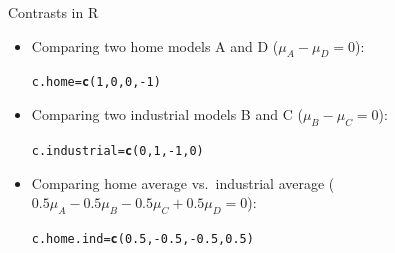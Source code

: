 \documentclass[unknownkeysallowed]{beamer}\usepackage[]{graphicx}\usepackage[]{color}
\makeatletter
\newcommand{\hlnum}[1]{\textcolor[rgb]{0.686,0.059,0.569}{#1}}%
\newcommand{\hlopt}[1]{\textcolor[rgb]{0,0,0}{#1}}%
\newcommand{\hlstd}[1]{\textcolor[rgb]{0.345,0.345,0.345}{#1}}%
\newcommand{\hlkwb}[1]{\textcolor[rgb]{0.69,0.353,0.396}{#1}}%
\newcommand{\hlkwd}[1]{\textcolor[rgb]{0.737,0.353,0.396}{\textbf{#1}}}%
\newenvironment{kframe}{%
 \def\at@end@of@kframe{}%
 \ifinner\ifhmode%
  \def\at@end@of@kframe{\end{minipage}}%
  \begin{minipage}{\columnwidth}%
 \fi\fi%
 \def\FrameCommand##1{\hskip\@totalleftmargin \hskip-\fboxsep
 \colorbox{shadecolor}{##1}\hskip-\fboxsep
     \hskip-\linewidth \hskip-\@totalleftmargin \hskip\columnwidth}%
 \MakeFramed {\advance\hsize-\width
   \@totalleftmargin\z@ \linewidth\hsize
   \@setminipage}}%
 {\par\unskip\endMakeFramed%
 \at@end@of@kframe}
\newenvironment{knitrout}{}{} %
\makeatother
\begin{document}
\begin{frame}[fragile]{Contrasts in R}
  
  \begin{itemize}
  \item Comparing two home models A and D ($\mu_A-\mu_D=0$):
\begin{knitrout}
\color{fgcolor}\begin{kframe}
\begin{alltt}
\hlstd{c.home}\hlkwb{=}\hlkwd{c}\hlstd{(}\hlnum{1}\hlstd{,}\hlnum{0}\hlstd{,}\hlnum{0}\hlstd{,}\hlopt{-}\hlnum{1}\hlstd{)}
\end{alltt}
\end{kframe}
\end{knitrout}

\item Comparing two industrial models B and C ($\mu_B-\mu_C=0$):
  
\begin{knitrout}
\color{fgcolor}\begin{kframe}
\begin{alltt}
\hlstd{c.industrial}\hlkwb{=}\hlkwd{c}\hlstd{(}\hlnum{0}\hlstd{,}\hlnum{1}\hlstd{,}\hlopt{-}\hlnum{1}\hlstd{,}\hlnum{0}\hlstd{)}
\end{alltt}
\end{kframe}
\end{knitrout}

\item Comparing home average vs.\ industrial average ($0.5\mu_A-0.5\mu_B-0.5\mu_C+0.5\mu_D=0$):
  
\begin{knitrout}
\color{fgcolor}\begin{kframe}
\begin{alltt}
\hlstd{c.home.ind}\hlkwb{=}\hlkwd{c}\hlstd{(}\hlnum{0.5}\hlstd{,}\hlopt{-}\hlnum{0.5}\hlstd{,}\hlopt{-}\hlnum{0.5}\hlstd{,}\hlnum{0.5}\hlstd{)}
\end{alltt}
\end{kframe}
\end{knitrout}
  \end{itemize}
  
\end{frame}
\end{document}
